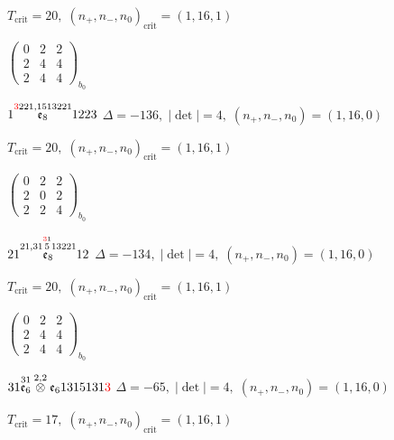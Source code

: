 \documentclass[10pt]{article}
\begin{document}
\hspace{1em}$T_{\text{crit}}=20,\; (n_+,n_-,n_0)_{\text{crit}}=(1,16,1)$

\hspace{2em}$\left(\begin{smallmatrix}0 & 2 & 2 \\ 2 & 4 & 4 \\ 2 & 4 & 4\end{smallmatrix}\right)_{\!b_0}$

\smallskip

$1\overset{\textcolor{red}{3}221,1513221}{\mathfrak{e}_8}1223$ \quad $\Delta=-136,\; |\det|=4,\; (n_+,n_-,n_0)=(1,16,0)$

\hspace{1em}$T_{\text{crit}}=20,\; (n_+,n_-,n_0)_{\text{crit}}=(1,16,1)$

\hspace{2em}$\left(\begin{smallmatrix}0 & 2 & 2 \\ 2 & 0 & 2 \\ 2 & 2 & 4\end{smallmatrix}\right)_{\!b_0}$

\smallskip

$21\overset{21,31\overset{\textcolor{red}{3}1}{5}13221}{\mathfrak{e}_8}12$ \quad $\Delta=-134,\; |\det|=4,\; (n_+,n_-,n_0)=(1,16,0)$

\hspace{1em}$T_{\text{crit}}=20,\; (n_+,n_-,n_0)_{\text{crit}}=(1,16,1)$

\hspace{2em}$\left(\begin{smallmatrix}0 & 2 & 2 \\ 2 & 4 & 4 \\ 2 & 4 & 4\end{smallmatrix}\right)_{\!b_0}$

\smallskip

$31\overset{31}{\mathfrak{e}_6}\overset{2,2}{\otimes}\mathfrak{e}_61315131\textcolor{red}{3}$ \quad $\Delta=-65,\; |\det|=4,\; (n_+,n_-,n_0)=(1,16,0)$

\hspace{1em}$T_{\text{crit}}=17,\; (n_+,n_-,n_0)_{\text{crit}}=(1,16,1)$
\end{document}
